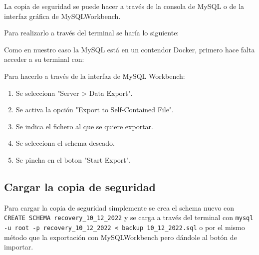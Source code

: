 \documentclass[a4paper, 11pt, oneside]{article} %
\begin{document}
La copia de seguridad se puede hacer a través de la consola de MySQL o de la interfaz gráfica de MySQLWorkbench.

Para realizarlo a través del terminal se haría lo siguiente:


Como en nuestro caso la MySQL está en un contendor Docker, primero hace falta acceder a su terminal con:


Para hacerlo a través de la interfaz de MySQL Workbench:

\begin{enumerate}
	\item Se selecciona "Server > Data Export".
	\item Se activa la opción "Export to Self-Contained File".
	\item Se indica el fichero al que se quiere exportar.
	\item Se selecciona el schema deseado.
	\item Se pincha en el boton "Start Export".
\end{enumerate}

\subsection{Cargar la copia de seguridad}

Para cargar la copia de seguridad simplemente se crea el schema nuevo con \texttt{CREATE SCHEMA recovery_10_12_2022} y se carga a través del terminal con \texttt{mysql -u root -p recovery_10_12_2022 < backup 10_12_2022.sql} o por el mismo método que la exportación con MySQLWorkbench pero dándole al botón de importar.
\end{document}
